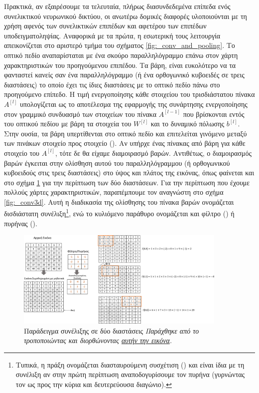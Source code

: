 Πρακτικά, αν εξαιρέσουμε τα τελευταία, πλήρως διασυνδεδεμένα επίπεδα ενός συνελικτικού νευρωνικού δικτύου, οι ανωτέρω δομικές διαφορές υλοποιούνται με τη χρήση αφενός των συνελικτικών επιπέδων και αφετέρου των επιπέδων υποδειγματοληψίας. Αναφορικά με τα πρώτα, η εσωτερική τους λειτουργία απεικονίζεται στο αριστερό τμήμα του σχήματος \ref{fig:_conv_and_pooling}.
Το οπτικό πεδίο αναπαρίσταται με ένα σκούρο παραλληλόγραμμο επάνω στον χάρτη χαρακτηριστικών του προηγούμενου επιπέδου. Τα βάρη, είναι ευκολότερο να τα φανταστεί κανείς σαν ένα παραλληλόγραμμο (ή ένα ορθογωνικό κυβοειδές σε τρεις διαστάσεις) το οποίο έχει τις ίδιες διαστάσεις με το οπτικό πεδίο πάνω στο προηγούμενο επίπεδο. Η τιμή ενεργοποίησης κάθε στοιχείου του τρισδιάστατου πίνακα $A^{[l]}$ υπολογίζεται ως το αποτέλεσμα της εφαρμογής της συνάρτησης ενεργοποίησης στον γραμμικό συνδυασμό των στοιχείων του πίνακα $A^{[l-1]}$ που βρίσκονται εντός του οπτικού πεδίου με βάρη τα στοιχεία του $W^{[l]}$ και το δυναμικό πόλωσης $b^{[l]}$. Στην ουσία, τα βάρη υπερτίθενται στο οπτικό πεδίο και επιτελείται γινόμενο μεταξύ των πινάκων στοιχείο προς στοιχείο (). Αν υπήρχε ένας πίνακας από βάρη για κάθε στοιχείο του $A^{[l]}$, τότε δε θα είχαμε διαμοιρασμό βαρών. Αντιθέτως, ο διαμοιρασμός βαρών έγκειται στην ολίσθηση αυτού του παραλληλόγραμμου (ή ορθογωνικού κυβοειδούς στις τρεις διαστάσεις) στο ύψος και πλάτος της εικόνας, όπως φαίνεται και στο σχήμα \ref{fig:_conv2d} για την περίπτωση των δύο διαστάσεων. Για την περίπτωση που έχουμε πολλούς χάρτες χαρακτηριστικών, παραπέμπουμε τον αναγνώστη στο σχήμα \ref{fig:_conv3d}. Αυτή η διαδικασία της ολίσθησης του πίνακα βαρών ονομάζεται δισδιάστατη συνέλιξη\footnote{Τυπικά, η πράξη ονομάζεται διασταυρούμενη συσχέτιση () και είναι ίδια με τη συνέλιξη αν στην πρώτη περίπτωση αναποδογυρίσουμε τον πυρήνα (γυρνώντας τον ως προς την κύρια και δευτερεύουσα διαγώνιο).}, ενώ το κυλιόμενο παράθυρο ονομάζεται και φίλτρο () ή πυρήνας (). \par

\begin{figure}[h]
  \centering
  \includegraphics[width=0.9\textwidth]{images/chapter theoritical background/convolve_example_step_1_greek.pdf}
  \caption{Παράδειγμα συνέλιξης σε δύο διαστάσεις \textit{Παράχθηκε από το \href{https://inkscape.org/}{} τροποποιώντας και διορθώνοντας \href{https://empirischtech.at/blog-image-filters}{αυτήν την εικόνα}.}}
  \label{fig:_conv2d}
\end{figure}

